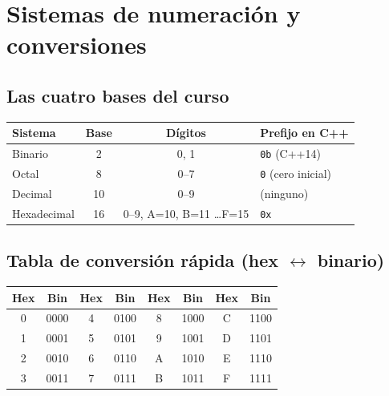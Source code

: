 \documentclass[12pt, oneside]{article}
\begin{document}
\newpage

\section{Sistemas de numeración y conversiones}

\subsection{Las cuatro bases del curso}

\begin{center}
\begin{tabular}{lccl}
  \toprule
  \textbf{Sistema} & \textbf{Base} & \textbf{Dígitos} & \textbf{Prefijo en C++} \\
  \midrule
  Binario       & 2  & 0, 1                        & \texttt{0b} (C++14) \\
  Octal         & 8  & 0–7                          & \texttt{0} (cero inicial) \\
  Decimal       & 10 & 0–9                          & (ninguno) \\
  Hexadecimal   & 16 & 0–9, A=10, B=11 \ldots F=15  & \texttt{0x} \\
  \bottomrule
\end{tabular}
\end{center}

\subsection{Tabla de conversión rápida (hex $\leftrightarrow$ binario)}

\begin{center}
\begin{tabular}{cc|cc|cc|cc}
  \toprule
  Hex & Bin  & Hex & Bin  & Hex & Bin  & Hex & Bin \\
  \midrule
  0 & 0000 & 4 & 0100 & 8 & 1000 & C & 1100 \\
  1 & 0001 & 5 & 0101 & 9 & 1001 & D & 1101 \\
  2 & 0010 & 6 & 0110 & A & 1010 & E & 1110 \\
  3 & 0011 & 7 & 0111 & B & 1011 & F & 1111 \\
  \bottomrule
\end{tabular}
\end{center}
\end{document}
